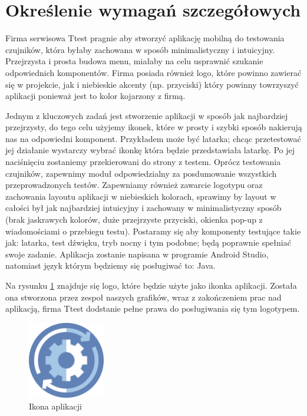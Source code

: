 \newpage
\section{Określenie wymagań szczegółowych}		%

\hspace{0.60cm}Firma serwisowa Ttest pragnie aby stworzyć aplikację mobilną do testowania czujników, która byłaby zachowana w sposób minimalistyczny i intuicyjny. Przejrzysta i prosta budowa menu, miałaby na celu usprawnić szukanie odpowiednich komponentów. Firma posiada również logo, które powinno zawierać się w projekcie, jak i niebieskie akcenty (np. przyciski) który powinny towrzyszyć aplikacji ponieważ jest to kolor kojarzony z firmą. \newline

Jednym z kluczowych zadań jest stworzenie aplikacji w sposób jak najbardziej przejrzysty, do tego celu użyjemy ikonek, które w prosty i szybki sposób nakierują nas na odpowiedni komponent. Przykładem może być latarka; chcąc przetestować jej działanie wystarczy wybrać ikonkę która będzie przedstawiała latarkę. Po jej naciśnięciu zostaniemy przekierowani do strony z testem. Oprócz testowania czujników, zapewnimy moduł odpowiedzialny za posdumowanie wszystkich przeprowadzonych testów. Zapewniamy również zawarcie logotypu oraz zachowania layoutu aplikacji w niebieskich kolorach, sprawimy by layout w całości był jak najbardziej intuicyjny i zachowany w minimalistyczny sposób (brak jaskrawych kolorów, duże przejrzyste przyciski, okienka pop-up z wiadomościami o przebiegu testu). Postaramy się aby komponenty testujące takie jak: latarka, test dźwięku, tryb nocny i tym podobne; będą poprawnie spełniać swoje zadanie. Aplikacja zostanie napisana w programie Android Studio, natomiast język którym będziemy się posługiwać to: Java. \newline 

Na rysunku \ref{rys:ikona} znajduje się logo, które będzie użyte jako ikonka aplikacji. Została ona stworzona przez zespoł naszych grafików, wraz z zakończeniem prac nad aplikacją, firma Ttest dodstanie pełne prawa do posługiwania się tym logotypem. \newline
\begin{figure}[!hbt]
	\begin{center}
		\includegraphics[angle=360, width=0.30\textwidth]{rys/punkt2/app_icon.png}
		\caption{Ikona aplikacji}
		\label{rys:ikona}
	\end{center}
\end{figure}

